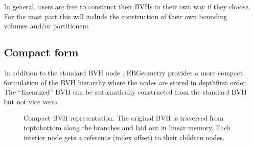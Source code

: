 \documentclass[letterpaper,10pt,english]{sphinxmanual}
\let\sphinxpxdimen\pdfpxdimen\else\newdimen\sphinxpxdimen
\begin{document}
\sphinxAtStartPar
In general, users are free to construct their BVHs in their own way if they choose.
For the most part this will include the construction of their own bounding volumes and/or partitioners.


\subsection{Compact form}
\label{\detokenize{ImplemBVH:compact-form}}\label{\detokenize{ImplemBVH:chap-linearbvh}}
\sphinxAtStartPar
In addition to the standard BVH node , EBGeometry provides a more compact formulation of the BVH hierarchy where the nodes are stored in depth\sphinxhyphen{}first order.
The “linearized” BVH can be automatically constructed from the standard BVH but not vice versa.

\begin{figure}[htbp]
\centering
\capstart

\noindent\sphinxincludegraphics[width=240\sphinxpxdimen]{{CompactBVH}.png}
\caption{Compact BVH representation.
The original BVH is traversed from top\sphinxhyphen{}to\sphinxhyphen{}bottom along the branches and laid out in linear memory.
Each interior node gets a reference (index offset) to their children nodes.}\label{\detokenize{ImplemBVH:id3}}\end{figure}
\end{document}
